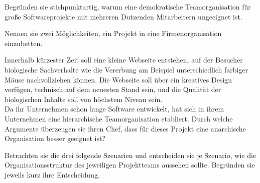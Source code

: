 \documentclass[12pt]{exam}
\begin{document}
\begin{questions}
\addpoints

\question[2] Begründen sie stichpunktartig, warum eine demokratische Teamorganisation für große Softwareprojekte mit mehreren Dutzenden Mitarbeitern ungeeignet ist.
\addpoints

\question[2] Nennen sie zwei Möglichkeiten, ein Projekt in eine Firmenorganisation einzubetten.
\addpoints

\question[4] Innerhalb kürzester Zeit soll eine kleine Webseite entstehen, auf der Besucher biologische Sachverhalte wie die Vererbung am Beispiel unterschiedlich farbiger Mäuse nachvollziehen können. Die Webseite soll über ein kreatives Design verfügen, technisch auf dem neuesten Stand sein, und die Qualität der biologischen Inhalte soll von höchstem Niveau sein. \\Da ihr Unternehmen schon lange Software entwickelt, hat sich in ihrem Unternehmen eine hierarchische Teamorganisation etabliert. Durch welche Argumente überzeugen sie ihren Chef, dass für dieses Projekt eine anarchische Organisation besser geeignet ist?
\addpoints

\question[9] Betrachten sie die drei folgende Szenarien und entscheiden sie je Szenario, wie die Organisationsstruktur des jeweiligen Projektteams aussehen sollte. Begründen sie jeweils kurz ihre Entscheidung.
\end{questions}
\end{document}
